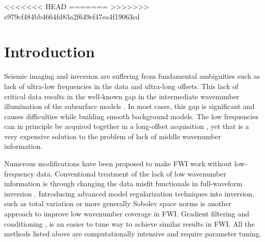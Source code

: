 \documentclass[paper,twocolomn]{geophysics}
\begin{document}

<<<<<<< HEAD
\newpage
=======
>>>>>>> e979cf484bb4664fd83a2f649ef47ea4f19063cd
\section{Introduction}
Seismic imaging and inversion are suffering from fundamental ambiguities such as lack of ultra-low frequencies in the data and ultra-long offsets. This lack of critical data results in the well-known gap in the intermediate wavenumber illumination of the subsurface models \citep{claerbout1985, mora1989, sirgue2004, alkhalifahFullmodelWavenumberInversion2016, kazei2016, kazei2018, yao2019extraction}. In most cases, this gap is significant and causes difficulties while building smooth background models. The low frequencies can in principle be acquired together in a long-offset acquisition \citep[e.g.][]{fons2013}, yet that is a very expensive solution to the problem of lack of middle wavenumber information.


Numerous modifications have been proposed to make FWI work without low-frequency data. %
Conventional treatment of the lack of low wavenumber information is through changing the data misfit functionals in full-waveform inversion \citep[e.g.][]{luo1991wave, bozdag2011, choi2012, leeuwen2013, sun2019robust}.
Introducing advanced model regularization techniques into inversion, such as total variation or more generally Sobolev space norms \citep[e.g.][]{esserTotalvariationRegularizationStrategies2016, kazeiSaltbodyInversionMinimum2017, kalita2019regularized, skopintseva2019regularization} is another approach to improve low wavenumber coverage in FWI.
Gradient filtering and conditioning \citep{ravaut2004multiscale, alkhalifah2015full, kazei2016, ovcharenko2018, ruan2018global}, is an easier to tune way to achieve similar results in FWI. All the methods listed above are computationally intensive and require parameter tuning.
\end{document}
